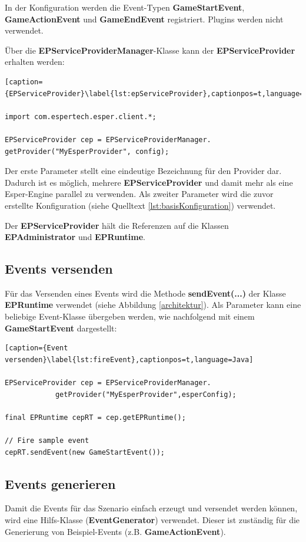 In der Konfiguration werden die Event-Typen \textbf{GameStartEvent}, \textbf{GameActionEvent} und \textbf{GameEndEvent} registriert. Plugins werden nicht verwendet.

Über die \textbf{EPServiceProviderManager}-Klasse kann der \textbf{EPServiceProvider} erhalten werden:

\begin{lstlisting}[caption={EPServiceProvider}\label{lst:epServiceProvider},captionpos=t,language=JAVA]

import com.espertech.esper.client.*;

EPServiceProvider cep = EPServiceProviderManager.
getProvider("MyEsperProvider", config);
\end{lstlisting}


Der erste Parameter stellt eine eindeutige Bezeichnung für den Provider dar. Dadurch ist es möglich, mehrere \textbf{EPServiceProvider} und damit mehr als eine Esper-Engine parallel zu verwenden. Als zweiter Parameter wird die zuvor  erstellte Konfiguration (siehe Quelltext \ref{lst:basisKonfiguration}) verwendet.

Der \textbf{EPServiceProvider} hält die Referenzen auf die Klassen \textbf{EPAdministrator} und \textbf{EPRuntime}. 

\subsection{Events versenden}
Für das Versenden eines Events wird die Methode \textbf{sendEvent(...)} der Klasse \textbf{EPRuntime} verwendet (siehe Abbildung \ref{architektur}). Als Parameter kann eine beliebige Event-Klasse übergeben werden, wie nachfolgend mit einem \textbf{GameStartEvent} dargestellt:

\begin{lstlisting}[caption={Event versenden}\label{lst:fireEvent},captionpos=t,language=Java]

EPServiceProvider cep = EPServiceProviderManager.
			getProvider("MyEsperProvider",esperConfig);

final EPRuntime cepRT = cep.getEPRuntime();

// Fire sample event
cepRT.sendEvent(new GameStartEvent());
\end{lstlisting}

\subsection{Events generieren}
Damit die Events für das Szenario einfach erzeugt und versendet werden können, wird eine Hilfs-Klasse (\textbf{EventGenerator}) verwendet. Dieser ist zuständig für die Generierung von Beispiel-Events (z.B. \textbf{GameActionEvent}).

